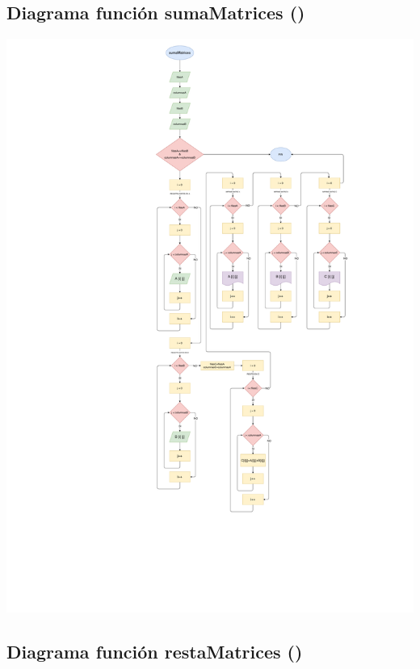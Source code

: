 \documentclass[letter]{revtex4}
\begin{document}
\subsection{Diagrama función sumaMatrices ()}
\begin{center}
 	\includegraphics[scale=0.3]{Images/Suma.pdf}
 	\label{figura4}
 \end{center}
\clearpage


\subsection{Diagrama función restaMatrices ()}
\end{document}

